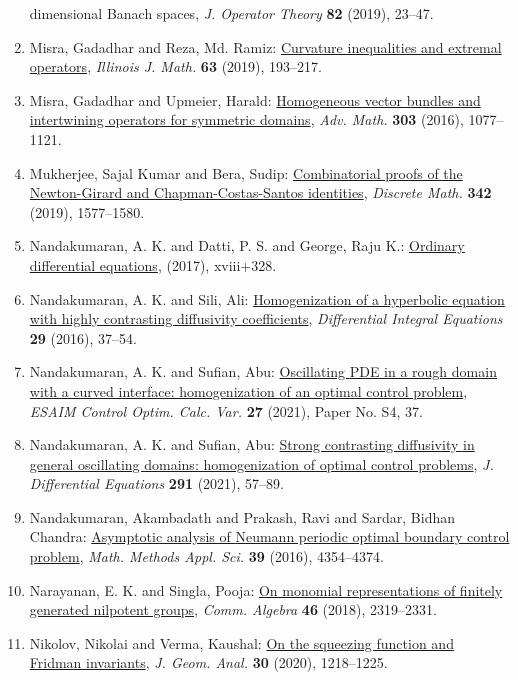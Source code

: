 \begin{enumerate}
{dimensional {B}anach spaces}, \emph{J. Operator Theory} {\bf 82} (2019), 23--47.
\item Misra, Gadadhar and Reza, Md. Ramiz: \href{https://doi.org/10.1215/00192082-7768711}{Curvature inequalities and extremal operators}, \emph{Illinois J. Math.} {\bf 63} (2019), 193--217.
\item Misra, Gadadhar and Upmeier, Harald: \href{https://doi.org/10.1016/j.aim.2016.08.036}{Homogeneous vector bundles and intertwining operators for
symmetric domains}, \emph{Adv. Math.} {\bf 303} (2016), 1077--1121.
\item Mukherjee, Sajal Kumar and Bera, Sudip: \href{https://doi.org/10.1016/j.disc.2019.02.013}{Combinatorial proofs of the {N}ewton-{G}irard and
{C}hapman-{C}ostas-{S}antos identities}, \emph{Discrete Math.} {\bf 342} (2019), 1577--1580.
\item Nandakumaran, A. K. and Datti, P. S. and George, Raju K.: \href{https://doi.org/10.1017/9781108236843}{Ordinary differential equations}, \emph{} {\bf } (2017), xviii+328.
\item Nandakumaran, A. K. and Sili, Ali: \href{http://projecteuclid.org/euclid.die/1448323252}{Homogenization of a hyperbolic equation with highly
contrasting diffusivity coefficients}, \emph{Differential Integral Equations} {\bf 29} (2016), 37--54.
\item Nandakumaran, A. K. and Sufian, Abu: \href{https://doi.org/10.1051/cocv/2020045}{Oscillating {PDE} in a rough domain with a curved interface:
homogenization of an optimal control problem}, \emph{ESAIM Control Optim. Calc. Var.} {\bf 27} (2021), Paper No. S4, 37.
\item Nandakumaran, A. K. and Sufian, Abu: \href{https://doi.org/10.1016/j.jde.2021.04.031}{Strong contrasting diffusivity in general oscillating domains:
homogenization of optimal control problems}, \emph{J. Differential Equations} {\bf 291} (2021), 57--89.
\item Nandakumaran, Akambadath and Prakash, Ravi and Sardar, Bidhan
Chandra: \href{https://doi.org/10.1002/mma.3865}{Asymptotic analysis of {N}eumann periodic optimal boundary
control problem}, \emph{Math. Methods Appl. Sci.} {\bf 39} (2016), 4354--4374.
\item Narayanan, E. K. and Singla, Pooja: \href{https://doi.org/10.1080/00927872.2017.1378894}{On monomial representations of finitely generated nilpotent
groups}, \emph{Comm. Algebra} {\bf 46} (2018), 2319--2331.
\item Nikolov, Nikolai and Verma, Kaushal: \href{https://doi.org/10.1007/s12220-019-00237-9}{On the squeezing function and {F}ridman invariants}, \emph{J. Geom. Anal.} {\bf 30} (2020), 1218--1225.

\end{enumerate}
